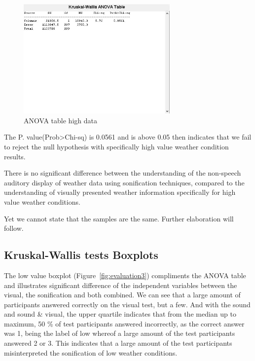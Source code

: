 \begin{figure}[!htbp]
    \centering
    \includegraphics[width=0.7\textwidth]{images/Evaluation6.jpg}
    \caption{ANOVA table high data}
    \label{fig:evaluation6}
\end{figure}

The P. value(Prob>Chi-sq) is 0.0561 and is above 0.05 then indicates that we fail to reject the null hypothesis with specifically high value weather condition results.

There is no significant difference between the understanding of the non-speech auditory display of weather data using sonification techniques, compared to the understanding of visually presented weather information specifically for high value weather conditions.

Yet we cannot state that the samples are the same. Further elaboration will follow.




\subsection{Kruskal-Wallis tests Boxplots} %
\label{sub:kruskal_wallis_tests_boxplots}

The low value boxplot (Figure~\ref{fig:evaluation3}) compliments the ANOVA table and illustrates significant difference of the independent variables between the visual, the sonification and both combined.
We can see that a large amount of participants answered correctly on the visual test, but a few. And with the sound and sound \& visual, the upper quartile indicates that from the median up to maximum, 50 \% of test participants answered incorrectly, as the correct answer was 1, being the label of low whereof a large amount of the test participants answered 2 or 3.  
This indicates that a large amount of the test participants misinterpreted the sonification of low weather conditions.

